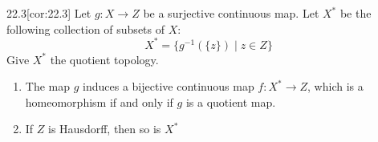\begin{thmBox}[Corollary]{22.3}[cor:22.3]
    Let \( g: X \rightarrow Z \) be a surjective continuous map.
    Let \( X^{ * } \) be the following collection of subsets of \( X \):
    \begin{equation*}
        X^{ * }
        =
        \{ g^{ -1 } ( \{ z \} ) \mid z \in Z \}
    \end{equation*}
    Give \( X^{ * } \) the quotient topology.
    
    \begin{enumerate}[label = (\alph*)]
        \item The map \( g \) induces a bijective continuous map \( f: X^{ * } 
            \rightarrow Z \), which is a homeomorphism if and only if \( g \) 
            is a quotient map.
            \begin{center}
            \end{center}
        \item If \( Z \) is Hausdorff, then so is \( X^{ * } \)
    \end{enumerate}

    \baseRule

    \begin{proofBox}

    \end{proofBox}
\end{thmBox}

